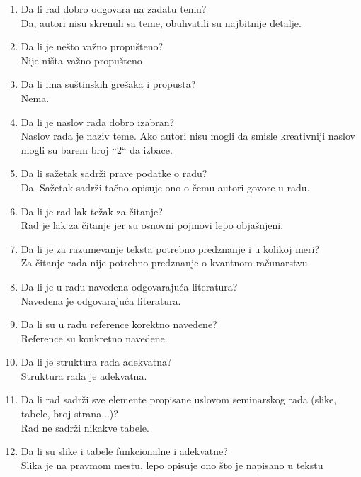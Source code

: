 \documentclass[a4paper]{report}
\begin{document}
\begin{enumerate}
\item Da li rad dobro odgovara na zadatu temu?\\
Da, autori nisu skrenuli sa teme, obuhvatili su najbitnije detalje.

\item Da li je nešto važno propušteno?\\
Nije ništa važno propušteno

\item Da li ima suštinskih grešaka i propusta?\\
Nema. 

\item Da li je naslov rada dobro izabran?\\
Naslov rada je naziv teme. Ako autori nisu mogli da smisle kreativniji naslov mogli su barem broj ``2`` da izbace. 

\item Da li sažetak sadrži prave podatke o radu?\\
Da. Sažetak sadrži tačno opisuje ono o čemu autori govore u radu.

\item Da li je rad lak-težak za čitanje?\\
Rad je lak za čitanje jer su osnovni pojmovi lepo objašnjeni.

\item Da li je za razumevanje teksta potrebno predznanje i u kolikoj meri?\\
Za čitanje rada nije potrebno predznanje o kvantnom računarstvu. 

\item Da li je u radu navedena odgovarajuća literatura?\\
Navedena je odgovarajuća literatura.

\item Da li su u radu reference korektno navedene?\\
Reference su konkretno navedene.

\item Da li je struktura rada adekvatna?\\
Struktura rada je adekvatna.

\item Da li rad sadrži sve elemente propisane uslovom seminarskog rada (slike, tabele, broj strana...)?\\
Rad ne sadrži nikakve tabele.

\item Da li su slike i tabele funkcionalne i adekvatne?\\
Slika je na pravmom mestu, lepo opisuje ono što je napisano u tekstu
\end{enumerate}
\end{document}
